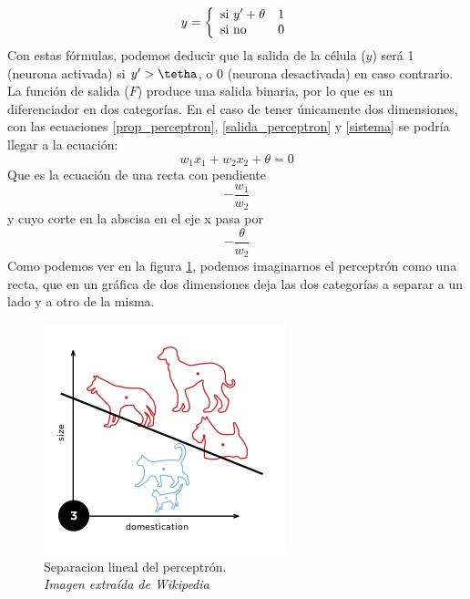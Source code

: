 \begin{equation}\label{sistema}
y =
\left\lbrace
\begin{array}{ll}
\textup{si } y' + \theta & 1\\
\textup{si no }  & 0
\end{array}
\right.
\end{equation}
Con estas fórmulas, podemos deducir que la salida de la célula (${y}$) será 1 (neurona activada) si ${y' > \tetha}$, o 0 (neurona desactivada) en caso contrario.\\
La función de salida (${F}$) produce una salida binaria, por lo que es un diferenciador en dos categorías. En el caso de tener únicamente dos dimensiones, con las ecuaciones \ref{prop_perceptron}, \ref{salida_perceptron} y \ref{sistema} se podría llegar a la ecuación:
\begin{equation}
w_{1}x_{1} + w_{2}x_{2} + \theta = 0
\end{equation}
Que es la ecuación de una recta con pendiente \begin{equation}-\frac{w_{1}}{w_{2}}\end{equation} y cuyo corte en la abscisa en el eje x pasa por \begin{equation}-\frac{\theta}{w_{2}}\end{equation}
Como podemos ver en la figura \ref{perceptron_recta}, podemos imaginarnos el perceptrón como una recta, que en un gráfica de dos dimensiones deja las dos categorías a separar a un lado y a otro de la misma.
\begin{figure}[htp]
\centering
\includegraphics[scale=0.5]{images/Perceptron_example.png}
\caption{Separacion lineal del perceptrón.\\\textit{Imagen extraída de Wikipedia}}
\label{perceptron_recta}
\end{figure}
